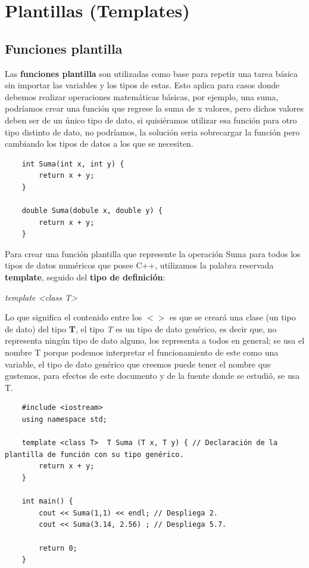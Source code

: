 \section{Plantillas (Templates)}


\subsection{Funciones plantilla}
\hspace{0.55cm}Las \textbf{funciones plantilla} son utilizadas como base para repetir una tarea básica sin importar las variables y los tipos de estas. Esto aplica para casos donde debemos realizar operaciones matemáticas básicas, por ejemplo, una suma, podríamos crear una función que regrese la suma de x valores, pero dichos valores deben ser de un único tipo de dato, si quisiéramos utilizar esa función para otro tipo distinto de dato, no podríamos, la solución seria sobrecargar la función pero cambiando los tipos de datos a los que se necesiten.
\begin{lstlisting}
    int Suma(int x, int y) {
        return x + y;
    }
    
    double Suma(dobule x, double y) {
        return x + y;
    }
\end{lstlisting}

Para crear una función plantilla que represente la operación Suma para todos los tipos de datos numéricos que posee C++, utilizamos la palabra reservada \textbf{template}, seguido del \textbf{tipo de definición}:
\begin{center}
	\textit{template <class T>}
\end{center}

Lo que significa el contenido entre los \textbf{$< >$} es que se creará una clase (un tipo de dato) del tipo \textbf{T}, el tipo \textit{T} es un tipo de dato genérico, es decir que, no representa ningún tipo de dato alguno, los representa a todos en general; se usa el nombre T porque podemos interpretar el funcionamiento de este como una variable, el tipo de dato genérico que creemos puede tener el nombre que gustemos, para efectos de este documento y de la fuente donde se estudió, se usa T.
\begin{lstlisting}
    #include <iostream>
    using namespace std;
    
    template <class T>  T Suma (T x, T y) { // Declaración de la plantilla de función con su tipo genérico.
        return x + y;
    }
    
    int main() {
        cout << Suma(1,1) << endl; // Despliega 2.
        cout << Suma(3.14, 2.56) ; // Despliega 5.7.
        
        return 0;
    }
\end{lstlisting}

